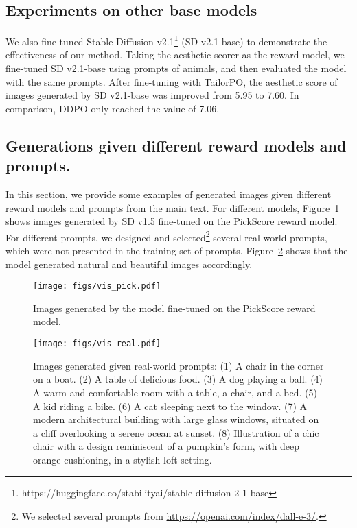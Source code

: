 \subsection{Experiments on other base models}

We also fine-tuned Stable Diffusion v2.1\footnote{https://huggingface.co/stabilityai/stable-diffusion-2-1-base} (SD v2.1-base) to demonstrate the effectiveness of our method.
Taking the aesthetic scorer as the reward model, we fine-tuned SD v2.1-base using prompts of animals, and then evaluated the model with the same prompts.
After fine-tuning with TailorPO, the aesthetic score of images generated by SD v2.1-base was improved from 5.95 to 7.60.
In comparison, DDPO only reached the value of 7.06.



\subsection{Generations given different reward models and prompts.}
In this section, we provide some examples of generated images given different reward models and prompts from the main text.
For different models, Figure~\ref{fig: vis-pick} shows images generated by SD v1.5 fine-tuned on the PickScore reward model.
For different prompts, we designed and selected\footnote{We selected several prompts from \url{https://openai.com/index/dall-e-3/}.} several real-world prompts, which were not presented in the training set of prompts. Figure~\ref{fig: real-world prompts} shows that the model generated natural and beautiful images accordingly.

\begin{figure}[h]
    \centering
    \texttt{[image: figs/vis\_pick.pdf]}
    \vspace{-5pt}
    \caption{Images generated by the model fine-tuned on the PickScore reward model.}
    \vspace{-5pt}
    \label{fig: vis-pick}
\end{figure}

\begin{figure}[h]
    \centering
    \texttt{[image: figs/vis\_real.pdf]}
    \vspace{-5pt}
    \caption{Images generated given real-world prompts: (1) A chair in the corner on a boat. (2) A table of delicious food. (3) A dog playing a ball. (4) A warm and comfortable room with a table, a chair, and a bed. (5) A kid riding a bike. (6) A cat sleeping next to the window. (7) A modern architectural building with large glass windows, situated on a cliff overlooking a serene ocean at sunset. (8) Illustration of a chic chair with a design reminiscent of a pumpkin’s form, with deep orange cushioning, in a stylish loft setting.
    }
    \label{fig: real-world prompts}
    \vspace{-5pt}
\end{figure}




